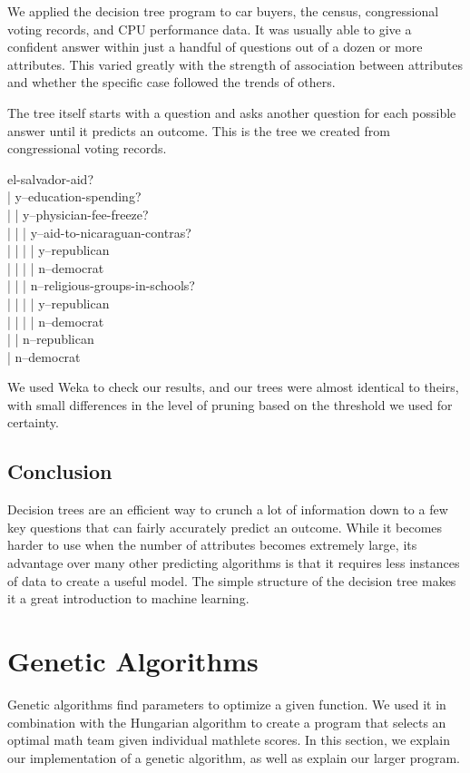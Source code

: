 \documentclass[11pt,a4paper]{article}
\begin{document}
We applied the decision tree program to car buyers, the census, congressional voting records, and CPU performance data. It was usually able to give a confident answer within just a handful of questions out of a dozen or more attributes. This varied greatly with the strength of association between attributes and whether the specific case followed the trends of others.

The tree itself starts with a question and asks another question for each possible answer until it predicts an outcome. This is the tree we created from congressional voting records.

{
\ttfamily
el-salvador-aid? \\
| y--education-spending? \\
| | y--physician-fee-freeze? \\
| | | y--aid-to-nicaraguan-contras? \\
| | | | y--republican \\
| | | | n--democrat \\
| | | n--religious-groups-in-schools? \\
| | | | y--republican \\
| | | | n--democrat \\
| | n--republican \\
| n--democrat
}

We used Weka to check our results, and our trees were almost identical to theirs, with small differences in the level of pruning based on the threshold we used for certainty.

\subsection{Conclusion}
\label{DecisionTrees:Conclusion}

Decision trees are an efficient way to crunch a lot of information down to a few key questions that can fairly accurately predict an outcome. While it becomes harder to use when the number of attributes becomes extremely large, its advantage over many other predicting algorithms is that it requires less instances of data to create a useful model. The simple structure of the decision tree makes it a great introduction to machine learning.

\section{Genetic Algorithms}
\label{Genetic Algorithms}

Genetic algorithms find parameters to optimize a given function. We used it in combination with the Hungarian algorithm to create a program that selects an optimal math team given individual mathlete scores. In this section, we explain our implementation of a genetic algorithm, as well as explain our larger program.
\end{document}
